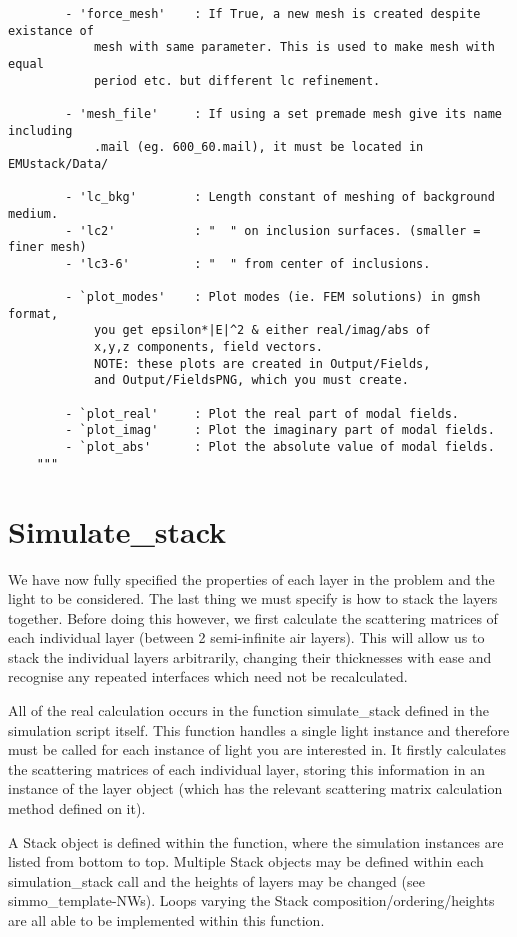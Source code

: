 \documentclass[11pt,a4paper,twoside]{report}
\begin{document}
\begin{lstlisting}
        - 'force_mesh'    : If True, a new mesh is created despite existance of 
            mesh with same parameter. This is used to make mesh with equal 
            period etc. but different lc refinement.

        - 'mesh_file'     : If using a set premade mesh give its name including 
            .mail (eg. 600_60.mail), it must be located in EMUstack/Data/

        - 'lc_bkg'        : Length constant of meshing of background medium.
        - 'lc2'           : "  " on inclusion surfaces. (smaller = finer mesh)
        - 'lc3-6'         : "  " from center of inclusions.

        - `plot_modes'    : Plot modes (ie. FEM solutions) in gmsh format, 
            you get epsilon*|E|^2 & either real/imag/abs of 
            x,y,z components, field vectors.
            NOTE: these plots are created in Output/Fields, 
            and Output/FieldsPNG, which you must create.

        - `plot_real'     : Plot the real part of modal fields.
        - `plot_imag'     : Plot the imaginary part of modal fields.
        - `plot_abs'      : Plot the absolute value of modal fields.
    """
\end{lstlisting}



\section{Simulate\_stack}
\label{stack}
We have now fully specified the properties of each layer in the problem and the light to be considered. The last thing we must specify is how to stack the layers together. Before doing this however, we first calculate the scattering matrices of each individual layer (between 2 semi-infinite air layers). This will allow us to stack the individual layers arbitrarily, changing their thicknesses with ease and recognise any repeated interfaces which need not be recalculated.

All of the real calculation occurs in the function simulate\_stack defined in the simulation script itself. This function handles a single light instance and therefore must be called for each instance of light you are interested in. It firstly calculates the scattering matrices of each individual layer, storing this information in an instance of the layer object (which has the relevant scattering matrix calculation method defined on it). 

A Stack object is defined within the function, where the simulation instances are listed from bottom to top. Multiple Stack objects may be defined within each simulation\_stack call and the heights of layers may be changed (see simmo\_template-NWs). Loops varying the Stack composition/ordering/heights are all able to be implemented within this function.
\end{document}
